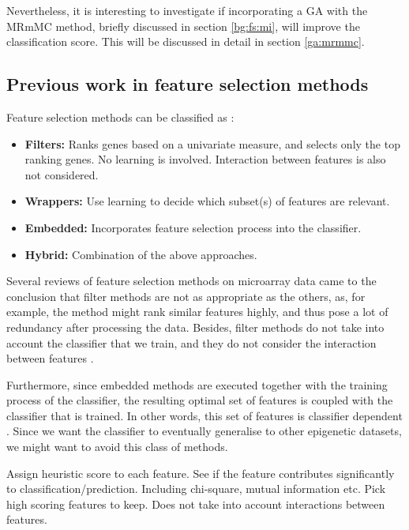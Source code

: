 \documentclass[12pt, twoside, a4paper]{report}
\begin{document}
Nevertheless, it is interesting to investigate if incorporating a GA with the MRmMC method, briefly discussed in section \ref{bg:fs:mi}, will improve the classification score. This will be discussed in detail in section \ref{ga:mrmmc}.


\subsection{Previous work in feature selection methods} \label{bg:fs:previous}

Feature selection methods can be classified as \cite{RefWorks:117, RefWorks:118}:
\begin{itemize}
\item \textbf{Filters:} Ranks genes based on a univariate measure, and selects only the top ranking genes. No learning is involved. Interaction between features is also not considered.
\item \textbf{Wrappers:} Use learning to decide which subset(s) of features are relevant.
\item \textbf{Embedded:} Incorporates feature selection process into the classifier.
\item \textbf{Hybrid:} Combination of the above approaches.
\end{itemize}

Several reviews of feature selection methods on microarray data \cite{RefWorks:117, RefWorks:118} came to the conclusion that filter methods are not as appropriate as the others, as, for example, the method might rank similar features highly, and thus pose a lot of redundancy after processing the data. Besides, filter methods do not take into account the classifier that we train, and they do not consider the interaction between features \cite{RefWorks:119}.

Furthermore, since embedded methods are executed together with the training process of the classifier, the resulting optimal set of features is coupled with the classifier that is trained. In other words, this set of features is classifier dependent \cite{RefWorks:118}. Since we want the classifier to eventually generalise to other epigenetic datasets, we might want to avoid this class of methods. 

Assign heuristic score to each feature. See if the feature contributes significantly to classification/prediction. Including chi-square, mutual information etc. Pick high scoring features to keep. Does not take into account interactions between features.
\end{document}
